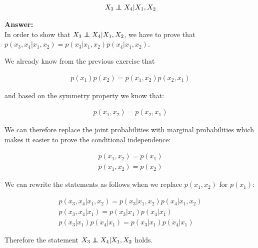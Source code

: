 \documentclass[a4paper]{article}
\newcommand\independent{\protect\mathpalette{\protect\independenT}{\perp}}
\def\independenT#1#2{\mathrel{\rlap{$#1#2$}\mkern2mu{#1#2}}}
\begin{document}
\begin{align*}
	X_3 \independent X_4 | X_1,X_2
\end{align*}

\textbf{Answer:}\\

In order to show that $X_3 \independent X_4 | X_1,X_2$, we have to prove that $p(x_3, x_4 | x_1, x_2) = p(x_3 | x_1, x_2)p(x_4 | x_1, x_2)$. 

We already know from the previous exercise that 

\begin{align*}
	p(x_1)p(x_2) = p(x_1,x_2)p(x_2,x_1)
\end{align*}

and based on the symmetry property we know that:

\begin{align*}
	p(x_1,x_2) = p(x_2,x_1)
\end{align*}

We can therefore replace the joint probabilities with marginal probabilities which makes it easier to prove the conditional independence:

\begin{align*}
	p(x_1,x_2) = p(x_1)\\
	p(x_1,x_2) = p(x_2)
\end{align*}

We can rewrite the statements as follows when we replace $p(x_1,x_2)$ for $p(x_1)$:

\begin{align*}
p(x_3, x_4 | x_1, x_2) = p(x_3 | x_1, x_2)p(x_4 | x_1, x_2)\\
p(x_3,x_4|x_1) = p(x_3|x_1)p(x_4|x_1)\\
p(x_3|x_1)p(x_4|x_1) = p(x_3|x_1)p(x_4|x_1)
\end{align*}

Therefore the statement $X_3 \independent X_4 | X_1,X_2$ holds.
\end{document}
